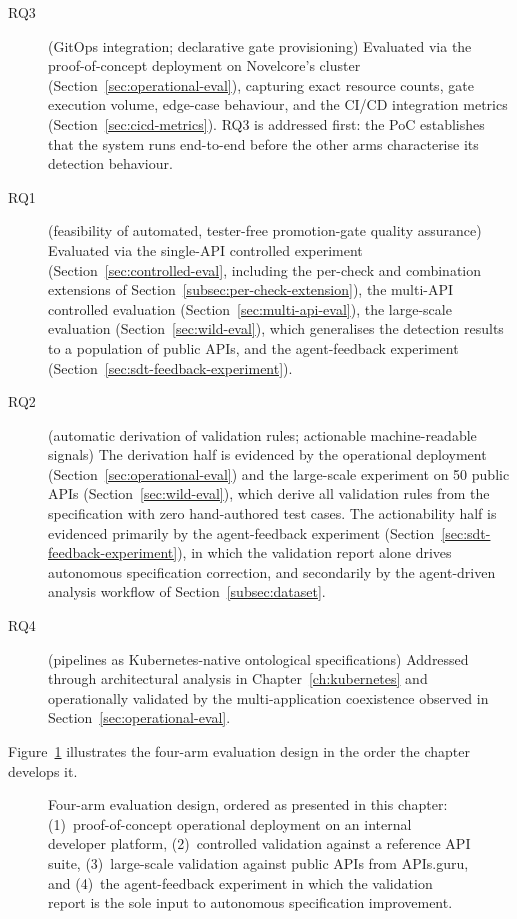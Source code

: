 \begin{description}
    \item[RQ3] (GitOps integration; declarative gate provisioning) Evaluated via the proof-of-concept deployment on Novelcore's cluster (Section~\ref{sec:operational-eval}), capturing exact resource counts, gate execution volume, edge-case behaviour, and the CI/CD integration metrics (Section~\ref{sec:cicd-metrics}). RQ3 is addressed first: the PoC establishes that the system runs end-to-end before the other arms characterise its detection behaviour.
    \item[RQ1] (feasibility of automated, tester-free promotion-gate quality assurance) Evaluated via the single-API controlled experiment (Section~\ref{sec:controlled-eval}, including the per-check and combination extensions of Section~\ref{subsec:per-check-extension}), the multi-API controlled evaluation (Section~\ref{sec:multi-api-eval}), the large-scale evaluation (Section~\ref{sec:wild-eval}), which generalises the detection results to a population of public APIs, and the agent-feedback experiment (Section~\ref{sec:sdt-feedback-experiment}).
    \item[RQ2] (automatic derivation of validation rules; actionable machine-readable signals) The derivation half is evidenced by the operational deployment (Section~\ref{sec:operational-eval}) and the large-scale experiment on 50 public APIs (Section~\ref{sec:wild-eval}), which derive all validation rules from the specification with zero hand-authored test cases. The actionability half is evidenced primarily by the agent-feedback experiment (Section~\ref{sec:sdt-feedback-experiment}), in which the validation report alone drives autonomous specification correction, and secondarily by the agent-driven analysis workflow of Section~\ref{subsec:dataset}.
    \item[RQ4] (pipelines as Kubernetes-native ontological specifications) Addressed through architectural analysis in Chapter~\ref{ch:kubernetes} and operationally validated by the multi-application coexistence observed in Section~\ref{sec:operational-eval}.
\end{description}

Figure~\ref{fig:eval-methodology} illustrates the four-arm evaluation design in the order the chapter develops it.

\begin{figure}[htbp]
\centering
\resizebox{\textwidth}{!}{%
%
}
\caption{Four-arm evaluation design, ordered as presented in this chapter: (1)~proof-of-concept operational deployment on an internal developer platform, (2)~controlled validation against a reference API suite, (3)~large-scale validation against public APIs from APIs.guru, and (4)~the agent-feedback experiment in which the validation report is the sole input to autonomous specification improvement.}
\label{fig:eval-methodology}
\end{figure}

